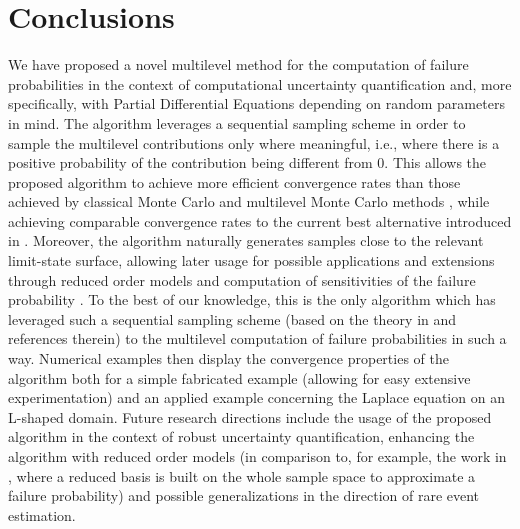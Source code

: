 \documentclass{article}
\theoremstyle{definition}
\begin{document}
\section{Conclusions}
\label{sec:conclusions}
We have proposed a novel multilevel method for the computation of failure probabilities in the context of computational uncertainty quantification and, more specifically, with Partial Differential Equations depending on random parameters in mind. The algorithm leverages a sequential sampling scheme in order to sample the multilevel contributions only where meaningful, i.e., where there is a positive probability of the contribution being different from $0$. This allows the proposed algorithm to achieve more efficient convergence rates than those achieved by classical Monte Carlo and multilevel Monte Carlo methods \cite{elfversonMultilevelMonteCarlo2016,haji-aliAdaptiveMultilevelMonte2022}, while achieving comparable convergence rates to the current best alternative introduced in \cite{elfversonMultilevelMonteCarlo2016}. Moreover, the algorithm naturally generates samples close to the relevant limit-state surface, allowing later usage for possible applications and extensions through reduced order models \cite{dasguptaFailureProbabilityEstimation2019} and computation of sensitivities of the failure probability \cite{papaioannouReliabilitySensitivityEstimation2018}. To the best of our knowledge, this is the only algorithm which has leveraged such a sequential sampling scheme (based on the theory in \cite{cerouSequentialMonteCarlo2012,cerouNonasymptoticTheoremUnnormalized2011,DelMoralFeynmanKac2004,delmoralGenealogicalParticleAnalysis2005,moralMultilevelSequentialMonte2017} and references therein) to the multilevel computation of failure probabilities in such a way. Numerical examples then display the convergence properties of the algorithm both for a simple fabricated example (allowing for easy extensive experimentation) and an applied example concerning the Laplace equation on an L-shaped domain. Future research directions include the usage of the proposed algorithm in the context of robust uncertainty quantification, enhancing the algorithm with reduced order models (in comparison to, for example, the work in \cite{aylwinUncertaintyQuantificationDiffraction2025}, where a reduced basis is built on the whole sample space to approximate a failure probability) and possible generalizations in the direction of rare event estimation.



\appendix
\end{document}
